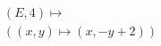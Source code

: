 \documentclass[preview]{standalone}
\begin{document}
\begin{align*}
(E,4) \mapsto \\( (x,y) \mapsto (x, -y + 2))
\end{align*}
\end{document}
